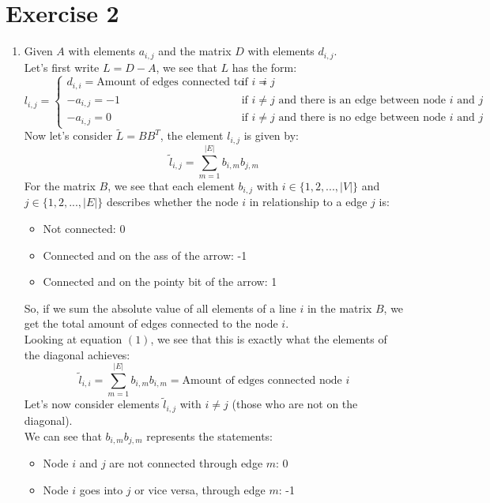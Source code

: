 \documentclass[11pt, legalpaper]{article}
\begin{document}
\section{Exercise 2}
\begin{enumerate}
    \item Given $A$ with elements $a_{i,j}$ and the matrix $D$ with elements $d_{i,j}$.\\
    Let's first write $L=D-A$, we see that $L$ has the form:
    $$l_{i,j}=\begin{cases}
        d_{i,i} = \text{Amount of edges connected to node $i$} & \text{if } i=j\\
        -a_{i,j}=-1 & \text{if } i \ne j \text{ and there is an edge between node $i$ and $j$}\\
        -a_{i,j}=0 & \text{if } i \ne j \text{ and there is no edge between node $i$ and $j$}
    \end{cases}$$
    Now let's consider $\tilde{L}=BB^T$, the element $l_{i,j}$ is given by:
    \begin{equation}\tilde{l}_{i,j}=\sum_{m=1}^{|E|}b_{i,m}b_{j,m}\end{equation}
    For the matrix $B$, we see that each element $b_{i,j}$ with $i \in \{1, 2, ...,|V|\}$ and $j \in \{1, 2, ...,|E|\}$ describes whether the node $i$ in relationship to a edge $j$ is:
    \begin{itemize}
        \item Not connected: 0
        \item Connected and on the ass of the arrow: -1
        \item Connected and on the pointy bit of the arrow: 1
    \end{itemize}
    So, if we sum the absolute value of all elements of a line $i$ in the matrix $B$, we get the total amount of edges connected to the node $i$.\\
    Looking at equation $(1)$, we see that this is exactly what the elements of the diagonal achieves: 
    $$\tilde{l}_{i,i}=\sum_{m=1}^{|E|}b_{i,m}b_{i,m}=\text{Amount of edges connected node $i$} $$
    Let's now consider elements $\tilde{l}_{i,j}$ with $i \ne j$ (those who are not on the diagonal). \\
    We can see that $b_{i,m}b_{j,m}$ represents the statements:
    \begin{itemize}
        \item Node $i$ and $j$ are not connected through edge $m$: 0
        \item Node $i$ goes into $j$ or vice versa, through edge $m$: -1

\end{itemize}
\end{enumerate}
\end{document}
